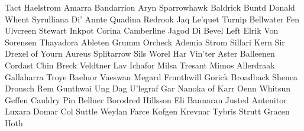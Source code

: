 Tact Haelstrom
Amarra Bandarrion
Aryn Sparrowhawk
Baldrick Buntd
Donald Whent
Syrulliana Di’ Annte
Quadina Redrook
Jaq Le’quet
Turnip Bellwater
Fen Ulvcreen
Stewart Inkpot
Corina Camberline
Jagod Di
Bevel Left
Elrik Von Sorensen
Thayadora Ableten
Grumm Orcheck
Ademia Strom
Sillari Kern
Sir Drexel of Yourn
Aureus Splitarrow
Sils Worel
Har Vin’ter
Aster Balleenen
Cordast Chin
Breck Veldtner
Lav Ichafor
Milsa Tresant
Mimos Allerdraak
Gallaharra Troye
Baelnor Vaeswan
Megard Frunthwill
Gorick Broadback
Shenea Dronsch
Rem Gunthwai
Ung Dag
U’legraf Gar
Nanoka of Karr
Oenn Whitsun
Geffen Cauldry
Pin Bellner
Borodred Hillsson
Eli Bannaran
Justed Antenitor
Luxara Domar
Col Suttle 
Weylan Farce
Kofgen Krevnar
Tybris Strutt
Gracen Hoth

